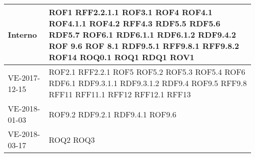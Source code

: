 \documentclass[../AnalisideiRequisiti.tex]{subfiles}
\begin{document}
\begin{longtable}{| p{4cm} | p{4cm} |}
		\newline Interno &  \newline ROF1 \newline RFF2.2.1.1 \newline ROF3.1 \newline ROF4 \newline ROF4.1  \newline ROF4.1.1  \newline ROF4.2  \newline RFF4.3 \newline RDF5.5  \newline RDF5.6  \newline RDF5.7 \newline ROF6.1 \newline RDF6.1.1 \newline RDF6.1.2 \newline RDF9.4.2 \newline ROF 9.6  \newline ROF 8.1  \newline RDF9.5.1  \newline RFF9.8.1  \newline RFF9.8.2 \newline ROF14 \newline ROQ0.1 \newline ROQ1 \newline RDQ1  \newline ROV1 \\[1em]
	\hline
		\newline  VE-2017-12-15 & \newline ROF2.1 \newline RFF2.2.1 \newline ROF5 \newline ROF5.2 \newline ROF5.3 \newline ROF5.4 \newline ROF6 \newline RDF6.1 \newline RDF9.3.1.1 \newline RDF9.3.1.2 \newline RDF9.4 \newline ROF9.5 \newline RFF9.8 \newline RFF11 \newline RFF11.1 \newline RFF12 \newline RFF12.1 \newline RFF13 \\[1em]
	\hline
		\newline VE-2018-01-03 & \newline ROF9.2 \newline RDF9.2.1 \newline RDF9.4.1 \newline ROF9.6 \\[1em]
	\hline
		\newline VE-2018-03-17 & \newline ROQ2 \newline ROQ3 \\[1em]	
		


\end{longtable}
\end{document}
